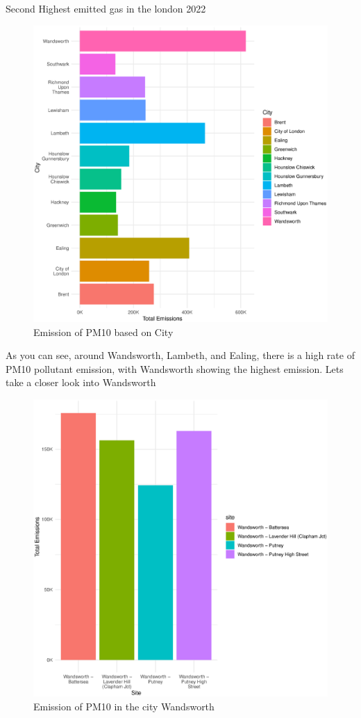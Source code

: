 \documentclass[]{article}
\begin{document}
Second Highest emitted gas in the london 2022


\begin{figure}[H]
	\centering
	\includegraphics[width=1\textwidth]{Graphs/PM10_by_site_graph.eps}
	\caption{Emission of PM10 based on City}
	\label{fig:PM10.1 }
\end{figure}

As you can see, around Wandsworth, Lambeth, and Ealing, there is a high rate of PM10 pollutant emission, with Wandsworth showing the highest emission. Lets take a closer look into Wandsworth

\begin{figure}[H]
	\centering
	\includegraphics[width=1\textwidth]{Graphs/PM10_by_Wandsworth_graph.eps}
	\caption{Emission of PM10 in the city Wandsworth}
	\label{fig:PM10.2 }
\end{figure}
\end{document}

